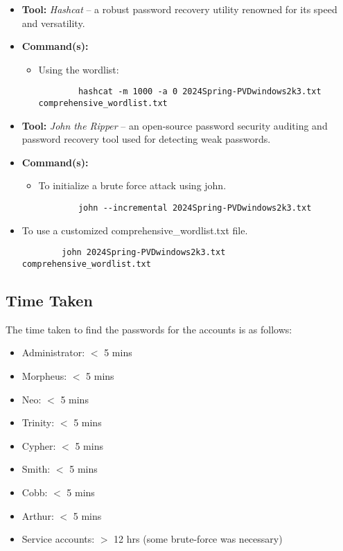 \documentclass{article}
\begin{document}
\begin{itemize}
    \item \textbf{Tool:} \textit{Hashcat} -- a robust password recovery utility renowned for its speed and versatility.
    \item \textbf{Command(s):} 
    \begin{itemize}
        \item Using the wordlist:
        \begin{verbatim}
        hashcat -m 1000 -a 0 2024Spring-PVDwindows2k3.txt comprehensive_wordlist.txt
        \end{verbatim}
    \end{itemize}
    \item \textbf{Tool:} \textit{John the Ripper} -- an open-source password security auditing and password recovery tool used for detecting weak passwords.
    \item \textbf{Command(s):} 
    \begin{itemize}
        \item To initialize a brute force attack using john.
        \begin{verbatim}
        john --incremental 2024Spring-PVDwindows2k3.txt
        \end{verbatim}
    \end{itemize}
        \item To use a customized comprehensive\_wordlist.txt file. 
        \begin{verbatim}
        john 2024Spring-PVDwindows2k3.txt comprehensive_wordlist.txt
        \end{verbatim}
\end{itemize}

\subsection{Time Taken}
The time taken to find the passwords for the accounts is as follows:

\begin{itemize}
    \item Administrator: $<$ 5 mins
    \item Morpheus: $<$ 5 mins
    \item Neo: $<$ 5 mins
    \item Trinity: $<$ 5 mins
    \item Cypher: $<$ 5 mins
    \item Smith: $<$ 5 mins
    \item Cobb: $<$ 5 mins
    \item Arthur: $<$ 5 mins
    
    \item Service accounts: $>$ 12 hrs (some brute-force was necessary)
\end{itemize}
\end{document}
